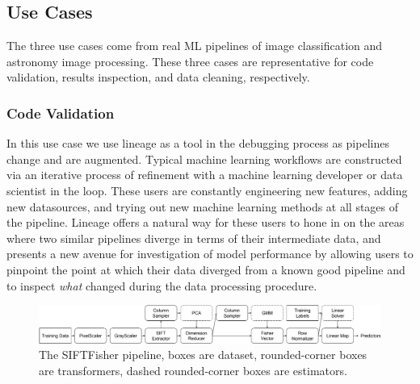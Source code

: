 \documentclass{sig-alternate}
\begin{document}
\subsection{Use Cases}
\label{sec:Back-cases}
The three use cases come from real ML pipelines of image classification and astronomy image processing. 
These three cases are representative for code validation, results inspection, and data cleaning, respectively.

\subsubsection{Code Validation}
In this use case we use lineage as a tool in the debugging process as pipelines change and are augmented. 
Typical machine learning workflows are constructed via an iterative process of refinement with a machine learning developer or data scientist in the loop.
These users are constantly engineering new features, adding new datasources, and trying out new machine learning methods at all stages of the pipeline.
Lineage offers a natural way for these users to hone in on the areas where two similar pipelines diverge in terms of their intermediate data, and presents a new avenue for investigation of model performance by allowing users to pinpoint the point at which their data diverged from a known good pipeline and to inspect \emph{what} changed during the data processing procedure. 


\begin{figure}[t]
\begin{center}
    \includegraphics[width=150mm]{pictures/VOCSIFTFisher}
    \caption {The SIFTFisher pipeline, boxes are dataset, rounded-corner boxes are transformers, dashed rounded-corner boxes are estimators.
    \label{fig:vocsiftfisher}
}
\end{center}
\end{figure}
\end{document}
